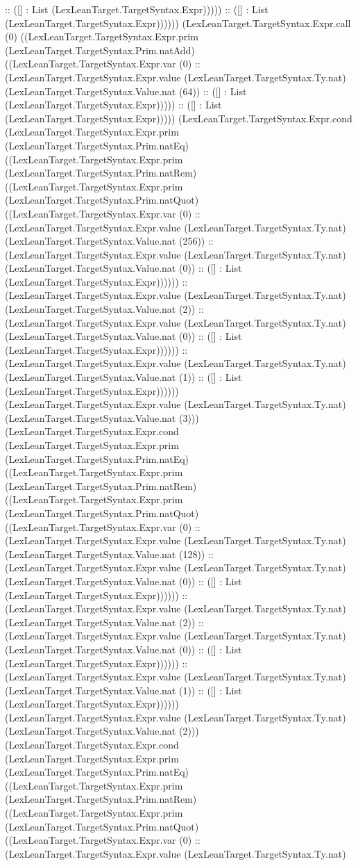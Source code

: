 \documentclass[11pt]{article}
\begin{document}
:: ([] : List (LexLeanTarget.TargetSyntax.Expr))))) :: ([] : List (LexLeanTarget.TargetSyntax.Expr)))))) (LexLeanTarget.TargetSyntax.Expr.call (0) ((LexLeanTarget.TargetSyntax.Expr.prim (LexLeanTarget.TargetSyntax.Prim.natAdd) ((LexLeanTarget.TargetSyntax.Expr.var (0) :: (LexLeanTarget.TargetSyntax.Expr.value (LexLeanTarget.TargetSyntax.Ty.nat) (LexLeanTarget.TargetSyntax.Value.nat (64)) :: ([] : List (LexLeanTarget.TargetSyntax.Expr))))) :: ([] : List (LexLeanTarget.TargetSyntax.Expr))))) (LexLeanTarget.TargetSyntax.Expr.cond (LexLeanTarget.TargetSyntax.Expr.prim (LexLeanTarget.TargetSyntax.Prim.natEq) ((LexLeanTarget.TargetSyntax.Expr.prim (LexLeanTarget.TargetSyntax.Prim.natRem) ((LexLeanTarget.TargetSyntax.Expr.prim (LexLeanTarget.TargetSyntax.Prim.natQuot) ((LexLeanTarget.TargetSyntax.Expr.var (0) :: (LexLeanTarget.TargetSyntax.Expr.value (LexLeanTarget.TargetSyntax.Ty.nat) (LexLeanTarget.TargetSyntax.Value.nat (256)) :: (LexLeanTarget.TargetSyntax.Expr.value (LexLeanTarget.TargetSyntax.Ty.nat) (LexLeanTarget.TargetSyntax.Value.nat (0)) :: ([] : List (LexLeanTarget.TargetSyntax.Expr)))))) :: (LexLeanTarget.TargetSyntax.Expr.value (LexLeanTarget.TargetSyntax.Ty.nat) (LexLeanTarget.TargetSyntax.Value.nat (2)) :: (LexLeanTarget.TargetSyntax.Expr.value (LexLeanTarget.TargetSyntax.Ty.nat) (LexLeanTarget.TargetSyntax.Value.nat (0)) :: ([] : List (LexLeanTarget.TargetSyntax.Expr)))))) :: (LexLeanTarget.TargetSyntax.Expr.value (LexLeanTarget.TargetSyntax.Ty.nat) (LexLeanTarget.TargetSyntax.Value.nat (1)) :: ([] : List (LexLeanTarget.TargetSyntax.Expr)))))) (LexLeanTarget.TargetSyntax.Expr.value (LexLeanTarget.TargetSyntax.Ty.nat) (LexLeanTarget.TargetSyntax.Value.nat (3))) (LexLeanTarget.TargetSyntax.Expr.cond (LexLeanTarget.TargetSyntax.Expr.prim (LexLeanTarget.TargetSyntax.Prim.natEq) ((LexLeanTarget.TargetSyntax.Expr.prim (LexLeanTarget.TargetSyntax.Prim.natRem) ((LexLeanTarget.TargetSyntax.Expr.prim (LexLeanTarget.TargetSyntax.Prim.natQuot) ((LexLeanTarget.TargetSyntax.Expr.var (0) :: (LexLeanTarget.TargetSyntax.Expr.value (LexLeanTarget.TargetSyntax.Ty.nat) (LexLeanTarget.TargetSyntax.Value.nat (128)) :: (LexLeanTarget.TargetSyntax.Expr.value (LexLeanTarget.TargetSyntax.Ty.nat) (LexLeanTarget.TargetSyntax.Value.nat (0)) :: ([] : List (LexLeanTarget.TargetSyntax.Expr)))))) :: (LexLeanTarget.TargetSyntax.Expr.value (LexLeanTarget.TargetSyntax.Ty.nat) (LexLeanTarget.TargetSyntax.Value.nat (2)) :: (LexLeanTarget.TargetSyntax.Expr.value (LexLeanTarget.TargetSyntax.Ty.nat) (LexLeanTarget.TargetSyntax.Value.nat (0)) :: ([] : List (LexLeanTarget.TargetSyntax.Expr)))))) :: (LexLeanTarget.TargetSyntax.Expr.value (LexLeanTarget.TargetSyntax.Ty.nat) (LexLeanTarget.TargetSyntax.Value.nat (1)) :: ([] : List (LexLeanTarget.TargetSyntax.Expr)))))) (LexLeanTarget.TargetSyntax.Expr.value (LexLeanTarget.TargetSyntax.Ty.nat) (LexLeanTarget.TargetSyntax.Value.nat (2))) (LexLeanTarget.TargetSyntax.Expr.cond (LexLeanTarget.TargetSyntax.Expr.prim (LexLeanTarget.TargetSyntax.Prim.natEq) ((LexLeanTarget.TargetSyntax.Expr.prim (LexLeanTarget.TargetSyntax.Prim.natRem) ((LexLeanTarget.TargetSyntax.Expr.prim (LexLeanTarget.TargetSyntax.Prim.natQuot) ((LexLeanTarget.TargetSyntax.Expr.var (0) :: (LexLeanTarget.TargetSyntax.Expr.value (LexLeanTarget.TargetSyntax.Ty.nat) 
\end{document}
